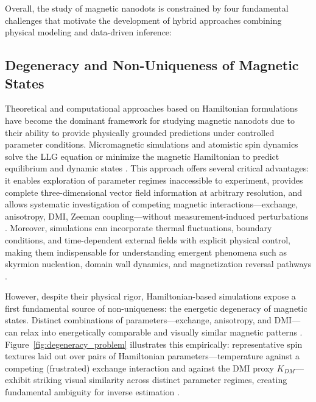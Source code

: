 \documentclass[letterpaper, 12, one column]{article}
\begin{document}
Overall, the study of magnetic nanodots is constrained by four fundamental challenges that motivate the development of hybrid approaches combining physical modeling and data-driven inference:

\vspace{0.5cm}

\subsection{Degeneracy and Non-Uniqueness of Magnetic States}


\vspace{0.5cm}

Theoretical and computational approaches based on Hamiltonian formulations have become the dominant framework for studying magnetic nanodots due to their ability to provide physically grounded predictions under controlled parameter conditions. Micromagnetic simulations and atomistic spin dynamics solve the LLG equation or minimize the magnetic Hamiltonian to predict equilibrium and dynamic states \cite{Li2023Magnetic}. This approach offers several critical advantages: it enables exploration of parameter regimes inaccessible to experiment, provides complete three-dimensional vector field information at arbitrary resolution, and allows systematic investigation of competing magnetic interactions—exchange, anisotropy, DMI, Zeeman coupling—without measurement-induced perturbations \cite{Misiurev2024Modeling}. Moreover, simulations can incorporate thermal fluctuations, boundary conditions, and time-dependent external fields with explicit physical control, making them indispensable for understanding emergent phenomena such as skyrmion nucleation, domain wall dynamics, and magnetization reversal pathways \cite{Reichhardt2022Skyrmions}.

However, despite their physical rigor, Hamiltonian-based simulations expose a first fundamental source of non-uniqueness: the energetic degeneracy of magnetic states. Distinct combinations of parameters—exchange, anisotropy, and DMI—can relax into energetically comparable and visually similar magnetic patterns \cite{Feng2024}. Figure~\ref{fig:degeneracy_problem} illustrates this empirically: representative spin textures laid out over pairs of Hamiltonian parameters—temperature against a competing (frustrated) exchange interaction and against the DMI proxy $K_{DM}$—exhibit striking visual similarity across distinct parameter regimes, creating fundamental ambiguity for inverse estimation \cite{Park2024}.
\end{document}
